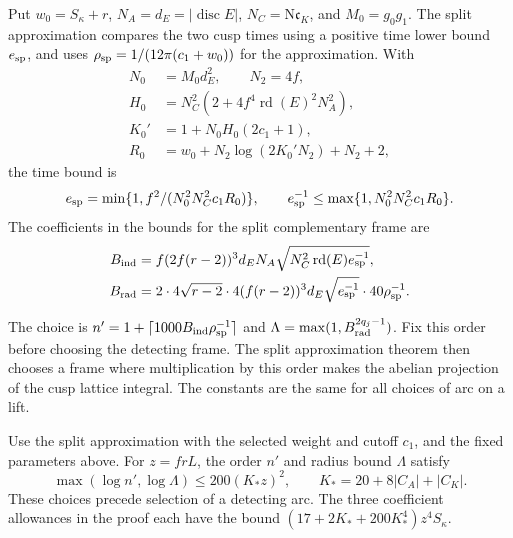 Put \(w_0=S_\kappa+r\), \(N_A=d_E=|\operatorname{disc}E|\),
\(N_C=\mathrm N\mathfrak c_K\), and \(M_0=g_0g_1\).
The split approximation compares the two cusp times using
a positive time lower bound \(e_{\rm sp}\), and uses
\(\rho_{\rm sp}=1/(12\pi(c_1+w_0))\) for the approximation.
With
\begin{align*}
 N_0&=M_0d_E^2,\qquad N_2=4f,\\
 H_0&=N_C^2(2+4f^4\operatorname{rd}(E)^2 N_A^2),\\
 K_0'&=1+N_0H_0(2c_1+1),\\
 R_0&=w_0+N_2\log(2K_0' N_2)+N_2+2 ,
\end{align*}
the time bound is
\[
 e_{\rm sp}=\min\{1,f^2/(N_0^2N_C^2c_1R_0)\},
 \qquad e_{\rm sp}^{-1}\le\max\{1,N_0^2N_C^2c_1R_0\}.
\] The coefficients in the bounds
for the split complementary frame are
\begin{align*}
 B_{\rm ind}&=f(2f(r-2))^3 d_E N_A
                     \sqrt{N_C^2\operatorname{rd}(E)e_{\rm sp}^{-1}},\\
 B_{\rm rad}&=2\cdot4\sqrt{r-2}\cdot
         4(f(r-2))^3d_E\sqrt{e_{\rm sp}^{-1}}\cdot40\rho_{\rm sp}^{-1}.
\end{align*}

The choice is \(n'=1+\lceil1000B_{\rm ind}\rho_{\rm sp}^{-1}\rceil\)
and \(\Lambda=\max(1,B_{\rm rad}^{2q_j-1})\).
Fix this order before choosing the detecting frame.
The split approximation theorem then chooses a frame
where multiplication by this order makes the abelian
projection of the cusp lattice integral. The constants
are the same for all choices of arc on a lift.

\begin{lemma}\label{lem:uniform-cm-arc-size}
Use the split approximation with the selected weight and
cutoff \(c_1\), and the fixed parameters above. For \(z=frL\),
the order \(n'\) and radius bound \(\Lambda\) satisfy
\[
 \max(\log n',\log\Lambda)\le200(K_*z)^2,\qquad K_*=20+8|C_A|+|C_K|.
\]
 These choices precede selection
of a detecting arc. The three coefficient allowances in
the proof each have the bound
\((17+2K_*+200K_*^4)z^4S_\kappa\).
\end{lemma}

